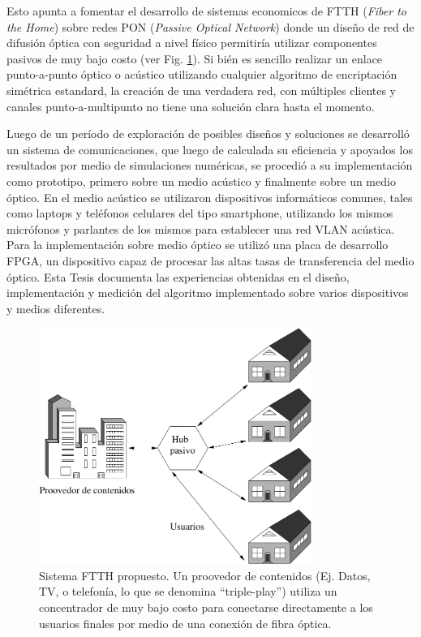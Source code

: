 Esto apunta a fomentar el desarrollo de sistemas economicos de FTTH (\textit{Fiber to the Home}) sobre redes PON (\textit{Passive Optical Network}) \cite{lee2006fiber} donde un diseño de red de difusión óptica con seguridad a nivel físico permitiría utilizar componentes pasivos de muy bajo costo (ver Fig. \ref{arch:ftth}). Si bién es sencillo realizar un enlace punto-a-punto óptico o acústico utilizando cualquier algoritmo de encriptación simétrica estandard, la creación de una verdadera red, con múltiples clientes y canales punto-a-multipunto no tiene una solución clara hasta el momento.

Luego de un período de exploración de posibles diseños y soluciones se desarrolló un sistema de comunicaciones, que luego de calculada su eficiencia y apoyados los resultados por medio de simulaciones numéricas, se procedió a su implementación como prototipo, primero sobre un medio acústico y finalmente sobre un medio óptico. 
En el medio acústico se utilizaron dispositivos informáticos comunes, tales como laptops y teléfonos celulares del tipo smartphone, utilizando los mismos micrófonos y parlantes de los mismos para establecer una red VLAN acústica. 
Para la implementación sobre medio óptico se utilizó una placa de desarrollo FPGA, un dispositivo capaz de procesar las altas tasas de transferencia del medio óptico.
Esta Tesis documenta las experiencias obtenidas en el diseño, implementación y medición del algoritmo implementado sobre varios dispositivos y medios diferentes.

\begin{figure}[!t]
  \centering
    \includegraphics[width=3.5in]{graphs/ftth.pdf}
    \caption{Sistema FTTH propuesto. Un proovedor de contenidos (Ej. Datos, TV, o telefonía, lo que se denomina ``triple-play'') utiliza un concentrador de muy bajo costo para conectarse directamente a los usuarios finales por medio de una conexión de fibra óptica.}
    \label{arch:ftth}
\end{figure}

